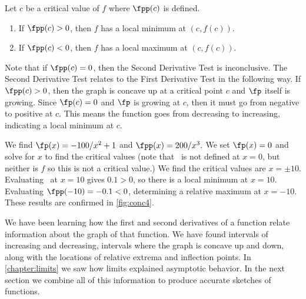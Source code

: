 %
{Let $c$ be a critical value of $f$ where $\fpp(c)$ is defined. 
\begin{enumerate}
\item If $\fpp(c)>0$, then $f$ has a local minimum at $(c,f(c))$.
\item If $\fpp(c)<0$, then $f$ has a local maximum at $(c,f(c))$.
\end{enumerate}}

Note that if $\fpp(c)=0$, then the Second Derivative Test is inconclusive. The Second Derivative Test relates to the First Derivative Test in the following way. If $\fpp(c)>0$, then the graph is concave up at a critical point $c$ and $\fp$ itself is growing.  Since $\fp(c)=0$ and $\fp$ is growing at $c$, then it must go from negative to positive at $c$.  This means the function goes from decreasing to increasing, indicating a local minimum at $c$.

{
%
We find $\fp(x)=-100/x^2+1$ and $\fpp(x) = 200/x^3.$  We set $\fp(x)=0$ and solve for $x$ to find the critical values (note that \fp\ is not defined at $x=0$, but neither is $f$ so this is not a critical value.) We find  the critical values are $x=\pm 10$.  Evaluating \fpp\ at $x=10$ gives $0.1>0$, so there is a local minimum at $x=10$.  Evaluating $\fpp(-10)=-0.1<0$, determining a relative maximum at  $x=-10$. These results are confirmed in \autoref{fig:conc4}.}

We have been learning how the first and second derivatives of a function relate information about the graph of that function. We have found intervals of increasing and decreasing, intervals where the graph is concave up and down, along with the locations of relative extrema and inflection points. In \autoref{chapter:limits} we saw how limits explained asymptotic behavior. In the next section we combine all of this information to produce accurate sketches of functions.


